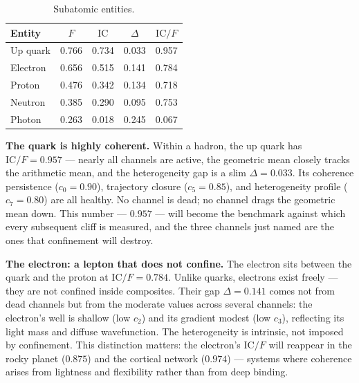 \documentclass[
  aps,
  prd,
  twocolumn,
  superscriptaddress,
  nofootinbib,
  floatfix
]{revtex4-2}
\newcommand{\IC}{\mathrm{IC}}
\begin{document}
\begin{table}[htbp]
\caption{\label{tab:subatomic}Subatomic entities.}
\begin{ruledtabular}
\begin{tabular}{lcccc}
Entity & $F$ & $\IC$ & $\Delta$ & $\IC/F$ \\
\hline
Up quark   & 0.766 & 0.734 & 0.033 & 0.957 \\
Electron   & 0.656 & 0.515 & 0.141 & 0.784 \\
Proton     & 0.476 & 0.342 & 0.134 & 0.718 \\
Neutron    & 0.385 & 0.290 & 0.095 & 0.753 \\
Photon     & 0.263 & 0.018 & 0.245 & 0.067 \\
\end{tabular}
\end{ruledtabular}
\end{table}

\textbf{The quark is highly coherent.}
Within a hadron, the up quark has $\IC/F = 0.957$ --- nearly
all channels are active, the geometric mean closely tracks the
arithmetic mean, and the heterogeneity gap is a slim $\Delta
= 0.033$.  Its coherence persistence ($c_0 = 0.90$),
trajectory closure ($c_5 = 0.85$), and heterogeneity profile
($c_7 = 0.80$) are all healthy.  No channel is dead; no
channel drags the geometric mean down.  This number ---
$0.957$ --- will become the benchmark against which every
subsequent cliff is measured, and the three channels just
named are the ones that confinement will destroy.

\textbf{The electron: a lepton that does not confine.}
The electron sits between the quark and the proton at
$\IC/F = 0.784$.  Unlike quarks, electrons exist freely ---
they are not confined inside composites.  Their gap
$\Delta = 0.141$ comes not from dead channels but from the
moderate values across several channels: the electron's
well is shallow (low $c_2$) and its gradient modest (low
$c_3$), reflecting its light mass and diffuse wavefunction.
The heterogeneity is intrinsic, not imposed by confinement.
This distinction matters: the electron's $\IC/F$ will
reappear in the rocky planet ($0.875$) and the cortical
network ($0.974$) --- systems where coherence arises from
lightness and flexibility rather than from deep binding.
\end{document}
